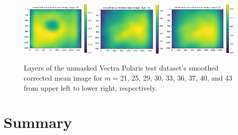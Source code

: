 \documentclass[letterpaper,11pt]{article}
\begin{document}
\begin{figure}[!ht]
\includegraphics[width=0.32\textwidth]{images/results/unmasked_smoothed_corrected_mean_image_layers_polaris/smoothed_corrected_mean_image_layer_37}
\includegraphics[width=0.32\textwidth]{images/results/unmasked_smoothed_corrected_mean_image_layers_polaris/smoothed_corrected_mean_image_layer_40}
\includegraphics[width=0.32\textwidth]{images/results/unmasked_smoothed_corrected_mean_image_layers_polaris/smoothed_corrected_mean_image_layer_43}
\caption{\footnotesize Layers of the unmasked Vectra Polaris test dataset's smoothed corrected mean image for $m=$21, 25, 29, 30, 33, 36, 37, 40, and 43 from upper left to lower right, respectively.}
\label{fig:unmasked_smoothed_corrected_mean_image_layers_polaris_2}
\end{figure}

\clearpage

\section{Summary}
\label{sec:summary}
\end{document}
